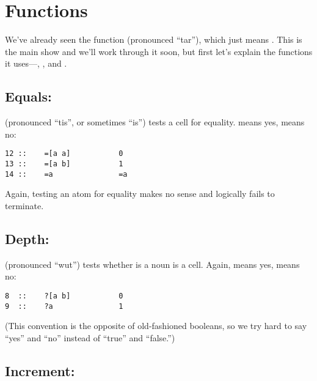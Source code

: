 \section{Functions}

We've already seen the \kode{*} function (pronounced ``tar''), which
just means .  This is the main show and we'll work through
it soon, but first let's explain the functions it uses---\kode{=}, ,
\kode{+} and \kode{/}.

\subsection{Equals: \kode{=}}

\kode{=} (pronounced ``tis'', or sometimes ``is'') tests a cell for
equality.   means yes,  means no:

\begin{framed_shaded}
\begin{Verbatim}[fontsize=\relsize{-2.5},fontseries=b,commandchars=\\\{\}]
12 ::    =[a a]           0
13 ::    =[a b]           1
14 ::    =a               =a
\end{Verbatim}
\end{framed_shaded}

Again, testing an atom for equality makes no sense and logically
fails to terminate.

\subsection{Depth: }

 (pronounced ``wut'') tests whether is a noun is a cell.  Again,
 means yes,  means no:

\begin{framed_shaded}
\begin{Verbatim}[fontsize=\relsize{-2.5},fontseries=b,commandchars=\\\{\}]
8  ::    ?[a b]           0
9  ::    ?a               1
\end{Verbatim}
\end{framed_shaded}

(This convention is the opposite of old-fashioned booleans, so we
try hard to say ``yes'' and ``no'' instead of ``true'' and ``false.'')

\subsection{Increment: \kode{+}}

